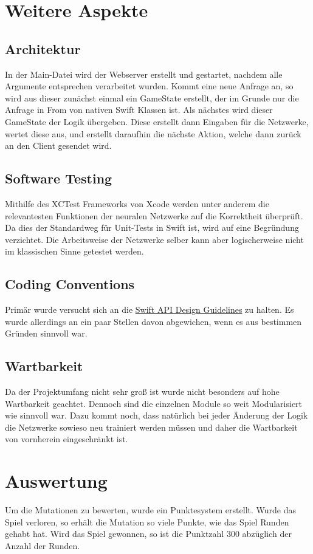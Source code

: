 \documentclass[11pt, twocolumn]{article}
\begin{document}
\section{Weitere Aspekte}
\subsection{Architektur}
In der Main-Datei wird der Webserver erstellt und gestartet, nachdem alle Argumente entsprechen verarbeitet wurden. Kommt eine neue Anfrage an, so wird aus dieser zunächst einmal ein GameState erstellt, der im Grunde nur die Anfrage in From von nativen Swift Klassen ist. Als nächstes wird dieser GameState der Logik übergeben. Diese erstellt dann Eingaben für die Netzwerke, wertet diese aus, und erstellt daraufhin die nächste Aktion, welche dann zurück an den Client gesendet wird.

\subsection{Software Testing}
Mithilfe des XCTest Frameworks von Xcode werden unter anderem die relevantesten Funktionen der neuralen Netzwerke auf die Korrektheit überprüft. Da dies der Standardweg für Unit-Tests in Swift ist, wird auf eine Begründung verzichtet. Die Arbeitsweise der Netzwerke selber kann aber logischerweise nicht im klassischen Sinne getestet werden.

\subsection{Coding Conventions}
Primär wurde versucht sich an die \href{https://swift.org/documentation/api-design-guidelines}{Swift API Design Guidelines} zu halten. Es wurde allerdings an ein paar Stellen davon abgewichen, wenn es aus bestimmen Gründen sinnvoll war.

\subsection{Wartbarkeit}
Da der Projektumfang nicht sehr groß ist wurde nicht besonders auf hohe Wartbarkeit geachtet. Dennoch sind die einzelnen Module so weit Modularisiert wie sinnvoll war. Dazu kommt noch, dass natürlich bei jeder Änderung der Logik die Netzwerke sowieso neu trainiert werden müssen und daher die Wartbarkeit von vornherein eingeschränkt ist.

\section{Auswertung}
Um die Mutationen zu bewerten, wurde ein Punktesystem erstellt. Wurde das Spiel verloren, so erhält die Mutation so viele Punkte, wie das Spiel Runden gehabt hat. Wird das Spiel gewonnen, so ist die Punktzahl 300 abzüglich der Anzahl der Runden.
\end{document}
